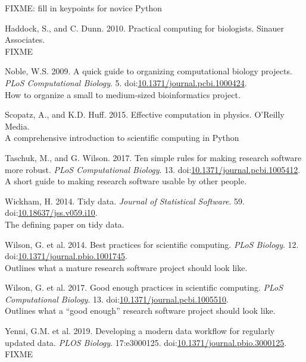 \documentclass[]{Nemilov}
\begin{document}
FIXME: fill in keypoints for novice Python

\hypertarget{refs}{}
\leavevmode\hypertarget{ref-Hadd2010}{}%
Haddock, S., and C. Dunn. 2010. Practical computing for biologists. Sinauer Associates.\\
FIXME

\leavevmode\hypertarget{ref-Nobl2009}{}%
Noble, W.S. 2009. A quick guide to organizing computational biology projects. \emph{PLoS Computational Biology}. 5. doi:\href{https://doi.org/10.1371/journal.pcbi.1000424}{10.1371/journal.pcbi.1000424}.\\
How to organize a small to medium-sized bioinformatics project.

\leavevmode\hypertarget{ref-Scop2015}{}%
Scopatz, A., and K.D. Huff. 2015. Effective computation in physics. O'Reilly Media.\\
A comprehensive introduction to scientific computing in Python

\leavevmode\hypertarget{ref-Tasc2017}{}%
Taschuk, M., and G. Wilson. 2017. Ten simple rules for making research software more robust. \emph{PLoS Computational Biology}. 13. doi:\href{https://doi.org/10.1371/journal.pcbi.1005412}{10.1371/journal.pcbi.1005412}.\\
A short guide to making research software usable by other people.

\leavevmode\hypertarget{ref-Wick2014}{}%
Wickham, H. 2014. Tidy data. \emph{Journal of Statistical Software}. 59. doi:\href{https://doi.org/10.18637/jss.v059.i10}{10.18637/jss.v059.i10}.\\
The defining paper on tidy data.

\leavevmode\hypertarget{ref-Wils2014}{}%
Wilson, G. et al. 2014. Best practices for scientific computing. \emph{PLoS Biology}. 12. doi:\href{https://doi.org/10.1371/journal.pbio.1001745}{10.1371/journal.pbio.1001745}.\\
Outlines what a mature research software project should look like.

\leavevmode\hypertarget{ref-Wils2017}{}%
Wilson, G. et al. 2017. Good enough practices in scientific computing. \emph{PLoS Computational Biology}. 13. doi:\href{https://doi.org/10.1371/journal.pcbi.1005510}{10.1371/journal.pcbi.1005510}.\\
Outlines what a ``good enough'' research software project should look like.

\leavevmode\hypertarget{ref-Yenn2019}{}%
Yenni, G.M. et al. 2019. Developing a modern data workflow for regularly updated data. \emph{PLOS Biology}. 17:e3000125. doi:\href{https://doi.org/10.1371/journal.pbio.3000125}{10.1371/journal.pbio.3000125}.\\
FIXME
\end{document}
